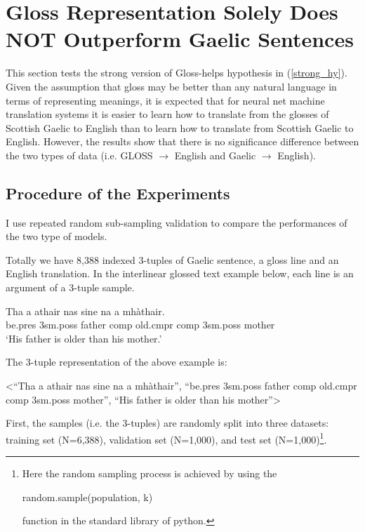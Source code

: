 \documentclass[a4paper]{article}
\begin{document}
\section{Gloss Representation Solely Does NOT Outperform Gaelic Sentences} \label{gd_to_gl_to_en}
This section tests the strong version of Gloss-helps hypothesis in (\ref{strong_hy}).
Given the assumption that gloss may be better than any natural language in terms of representing meanings, it is expected that for neural net machine translation systems it is easier to learn how to translate from the glosses of Scottish Gaelic to English than to learn how to translate from Scottish Gaelic to English. However, the results show that there is no significance difference between the two types of data (i.e. GLOSS $\rightarrow$ English and Gaelic $\rightarrow$ English). 

\subsection{Procedure of the Experiments}
I use repeated random sub-sampling validation to compare the performances of the two type of models.

Totally we have 8,388 indexed 3-tuples of Gaelic sentence, a gloss line and an English translation. In the interlinear glossed text example below, each line is an argument of a 3-tuple sample. 

\begin{exe}  
\ex \gll    Tha a athair nas sine na a mh\`athair.\\  
            be.pres 3sm.poss father comp old.cmpr comp 3sm.poss mother
\\  
    \glt    `His father is older than his mother.'  
\end{exe}

The 3-tuple representation of the above example is:
\begin{exe}
 \ex <``Tha a athair nas sine na a mh\`athair'', ``be.pres 3sm.poss father comp old.cmpr comp 3sm.poss mother'', ``His father is older than his mother''>
\end{exe}

First, the samples (i.e. the 3-tuples) are randomly split into three datasets: training set (N=6,388), validation set (N=1,000), and test set (N=1,000)\footnote{Here the random sampling process is achieved by using the \begin{myfont}random.sample(population, k)\end{myfont} function in the standard library of python.}. 
\end{document}
